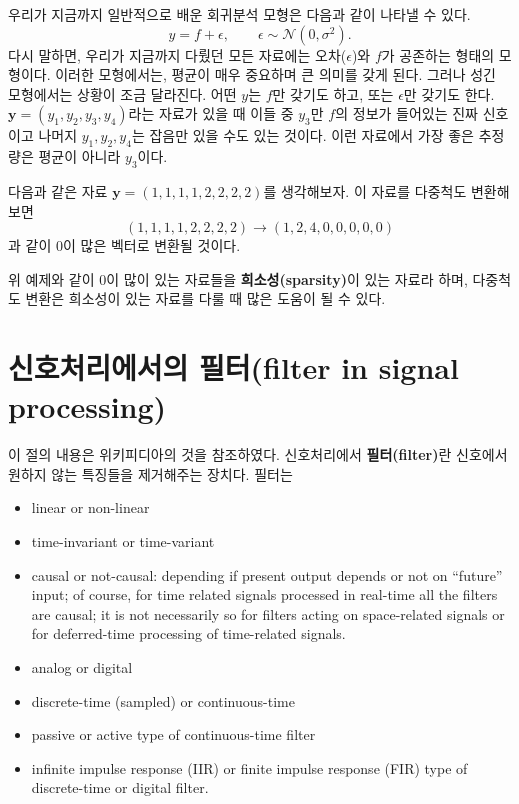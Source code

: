 \documentclass[b5paper,]{scrbook}
\theoremstyle{plain}
\theoremstyle{definition}
\numberwithin{equation}{section}
\let\BeginKnitrBlock\begin \let\EndKnitrBlock\end
\begin{document}
우리가 지금까지 일반적으로 배운 회귀분석 모형은 다음과 같이 나타낼 수 있다.
\[y=f+\epsilon, \qquad{\epsilon \sim \mathcal{N}(0,\sigma^{2}).}\]
다시 말하면, 우리가 지금까지 다뤘던 모든 자료에는 오차(\(\epsilon\))와 \(f\)가 공존하는 형태의 모형이다. 이러한 모형에서는, 평균이 매우 중요하며 큰 의미를 갖게 된다. 그러나 성긴 모형에서는 상황이 조금 달라진다. 어떤 \(y\)는 \(f\)만 갖기도 하고, 또는 \(\epsilon\)만 갖기도 한다. \(\mathbf{y}=(y_{1},y_{2},y_{3},y_{4})\)라는 자료가 있을 때 이들 중 \(y_{3}\)만 \(f\)의 정보가 들어있는 진짜 신호이고 나머지 \(y_{1},y_{2},y_{4}\)는 잡음만 있을 수도 있는 것이다. 이런 자료에서 가장 좋은 추정량은 평균이 아니라 \(y_{3}\)이다.

\BeginKnitrBlock{theorem}[다중척도 변환의 희소성]
\protect\hypertarget{thm:unnamed-chunk-273}{}{\label{thm:unnamed-chunk-273} {} }
다음과 같은 자료 \(\mathbf{y}=(1,1,1,1,2,2,2,2)\)를 생각해보자. 이 자료를 다중척도 변환해 보면
\[(1,1,1,1,2,2,2,2) \rightarrow (1,2,4,0,0,0,0,0)\]
과 같이 0이 많은 벡터로 변환될 것이다.
\EndKnitrBlock{theorem}

위 예제와 같이 0이 많이 있는 자료들을 \textbf{희소성(sparsity)}이 있는 자료라 하며, 다중척도 변환은 희소성이 있는 자료를 다룰 때 많은 도움이 될 수 있다.

\hypertarget{-filter-in-signal-processing}{%
\section{신호처리에서의 필터(filter in signal processing)}\label{-filter-in-signal-processing}}

이 절의 내용은 위키피디아의 것을 참조하였다. 신호처리에서 \textbf{필터(filter)}란 신호에서 원하지 않는 특징들을 제거해주는 장치다. 필터는

\begin{itemize}
\item
  linear or non-linear
\item
  time-invariant or time-variant
\item
  causal or not-causal: depending if present output depends or not on ``future'' input; of course, for time related signals processed in real-time all the filters are causal; it is not necessarily so for filters acting on space-related signals or for deferred-time processing of time-related signals.
\item
  analog or digital
\item
  discrete-time (sampled) or continuous-time
\item
  passive or active type of continuous-time filter
\item
  infinite impulse response (IIR) or finite impulse response (FIR) type of discrete-time or digital filter.
\end{itemize}
\end{document}
